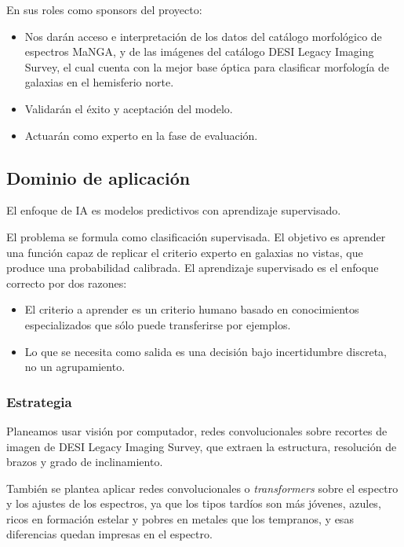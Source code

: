 \documentclass[12pt]{article}
\begin{document}
En sus roles como sponsors del proyecto:

\begin{itemize}
    \item Nos darán acceso e interpretación de los datos del catálogo morfológico de espectros MaNGA, y de las imágenes del catálogo DESI Legacy Imaging Survey, el cual cuenta con la mejor base óptica para clasificar morfología de galaxias en el hemisferio norte.
    \item Validarán el éxito y aceptación del modelo.
    \item Actuarán como experto en la fase de evaluación.
\end{itemize}

\subsection{Dominio de aplicación}

El enfoque de IA es modelos predictivos con aprendizaje supervisado.

El problema se formula como clasificación supervisada. El objetivo es aprender una función capaz de replicar el criterio experto en galaxias no vistas, que produce una probabilidad calibrada. El aprendizaje supervisado es el enfoque correcto por dos razones:

\begin{itemize}
    \item El criterio a aprender es un criterio humano basado en conocimientos especializados que sólo puede transferirse por ejemplos.
    \item Lo que se necesita como salida es una decisión bajo incertidumbre discreta, no un agrupamiento.
\end{itemize}

\subsubsection{Estrategia}

Planeamos usar visión por computador, redes convolucionales sobre recortes de imagen de DESI Legacy Imaging Survey, que extraen la estructura, resolución de brazos y grado de inclinamiento.

También se plantea aplicar redes convolucionales o \textit{transformers} sobre el espectro y los ajustes de los espectros, ya que los tipos tardíos son más jóvenes, azules, ricos en formación estelar y pobres en metales que los tempranos, y esas diferencias quedan impresas en el espectro.
\end{document}
